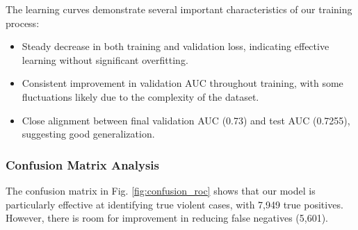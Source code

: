 \documentclass[conference]{IEEEtran}
\begin{document}
The learning curves demonstrate several important characteristics of our training process:

\begin{itemize}
    \item Steady decrease in both training and validation loss, indicating effective learning without significant overfitting.
    \item Consistent improvement in validation AUC throughout training, with some fluctuations likely due to the complexity of the dataset.
    \item Close alignment between final validation AUC (0.73) and test AUC (0.7255), suggesting good generalization.
\end{itemize}

\subsubsection{Confusion Matrix Analysis}
The confusion matrix in Fig. \ref{fig:confusion_roc} shows that our model is particularly effective at identifying true violent cases, with 7,949 true positives. However, there is room for improvement in reducing false negatives (5,601).
\end{document}
